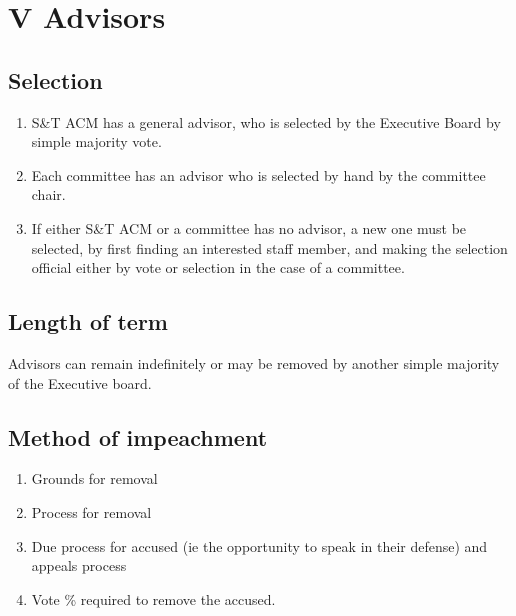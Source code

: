 
\section{V \textendash{} Advisors}
\subsection{Selection}
\begin{enumerate}
  \item S\&T ACM has a general advisor, who is selected by the Executive Board
  by simple majority vote.
  \item Each committee has an advisor who is selected by hand by the committee
  chair.
  \item If either S\&T ACM or a committee has no advisor, a new one must be
  selected, by first finding an interested staff member, and making the
  selection official either by vote or selection in the case of a committee.
\end{enumerate}
\subsection{Length of term}
  Advisors can remain indefinitely or may be removed by another simple majority
  of the Executive board.
\subsection{Method of impeachment}
    \begin{enumerate}[label=\arabic*.]
      \item Grounds for removal
      \item Process for removal
      \item Due process for accused (ie the opportunity to speak in their
      defense) and appeals process
      \item Vote \% required to remove the accused.
    \end{enumerate}

